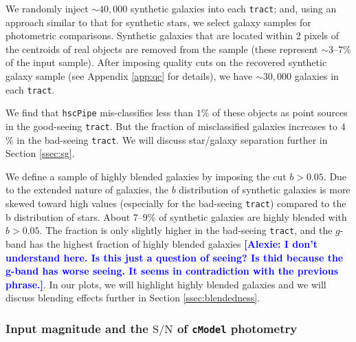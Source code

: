\documentclass[useamsfonts]{pasj01}
\def\asec{$^{\prime\prime}$}
\newcommand{\alexie}[1]{\textcolor{blue}{\textbf{[Alexie: #1]}}}
\def\hscpipe{\texttt{hscPipe}}
\def\cmodel{\texttt{cModel}}
\def\tract{\texttt{tract}}
\def\s2n{{$\mathrm{S}/\mathrm{N}$}}
\begin{document}
    We randomly inject ${\sim}40,000$ synthetic galaxies into each
    \tract{}; and, using an approach similar to that for synthetic stars, we select 
    galaxy samples for photometric comparisons. Synthetic galaxies that are located within 2 pixels 
    of the centroids of real objects are removed from the sample  (these represent ${\sim}3$--$7$\% of the input sample). After imposing quality cuts on the  recovered synthetic galaxy sample (see Appendix \ref{app:qc} for details), we have ${\sim}30,000$
    galaxies in each \tract{}.
    
    We find that \hscpipe{} mis-classifies less than $1$\% of these objects as point sources
    in the good-seeing \tract{}.
    But the fraction of misclassified galaxies increases to $4$\% in the
    bad-seeing \tract{}. We will discuss star/galaxy separation further in Section \ref{ssec:sg}.

    We define a sample of highly blended galaxies  by imposing the cut $b>0.05$.
    Due to the extended nature of galaxies, the $b$ distribution of synthetic 
    galaxies is more skewed toward high values (especially for the bad-seeing \tract{}) compared to the b distribution of stars.
    About $7$--$9$\% of synthetic galaxies are highly blended with $b>0.05$.
    The fraction is only slightly higher in the bad-seeing \tract{}, and the
    $g$-band has the highest fraction of highly blended galaxies \alexie{I don't understand here. Is this just a question of seeing? Is thid because the g-band has worse seeing. It seems in contradiction with the previous phrase.}. In our plots, we will highlight highly blended galaxies and we will discuss blending effects further in Section \ref{ssec:blendedness}.


\subsubsection{Input magnitude and the \s2n{} of \cmodel{} photometry}
\end{document}
